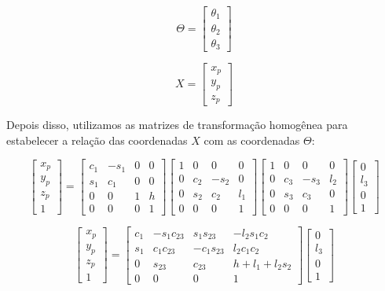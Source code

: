 \documentclass[12pt,a4paper]{article}
\begin{document}
\begin{multicols}{2}

$$ \Theta =
\begin{bmatrix}
\theta_1 \\
\theta_2 \\
\theta_3
\end{bmatrix} 
$$

$$ X =
\begin{bmatrix}
x_p \\
y_p \\
z_p
\end{bmatrix} 
$$

\end{multicols}

Depois disso, utilizamos as matrizes de transformação homogênea para estabelecer a relação das coordenadas $X$ com as coordenadas $\Theta$:

$$
\begin{bmatrix}
x_p \\
y_p \\
z_p \\
1
\end{bmatrix}
=
\begin{bmatrix}
c_1 & -s_1 & 0 & 0 \\
s_1 & c_1 & 0 & 0 \\
0 & 0 & 1 & h \\
0 & 0 & 0 & 1
\end{bmatrix}
\begin{bmatrix}
1 & 0 & 0 & 0  \\
0 & c_2 & -s_2 & 0 \\
0 & s_2 & c_2 & l_1 \\
0 & 0 & 0 & 1
\end{bmatrix}
\begin{bmatrix}
1 & 0 & 0 & 0 \\
0 & c_3 & -s_3 & l_2 \\
0 & s_3 & c_3 & 0 \\
0 & 0 & 0 & 1
\end{bmatrix}
\begin{bmatrix}
0 \\
l_3 \\
0 \\
1
\end{bmatrix}
$$

$$
\begin{bmatrix}
x_p \\
y_p \\
z_p \\
1
\end{bmatrix}
=
\begin{bmatrix}
c_1 & -s_1 c_{23} & s_1 s_{23} & -l_2 s_1 c_2 \\
s_1 & c_1 c_{23} & -c_1 s_{23} & l_2 c_1 c_2 \\
0 & s_{23} & c_{23} & h + l_1 + l_2 s_2 \\
0 & 0 & 0 & 1
\end{bmatrix}
\begin{bmatrix}
0 \\
l_3 \\
0 \\
1
\end{bmatrix}
$$
\end{document}
